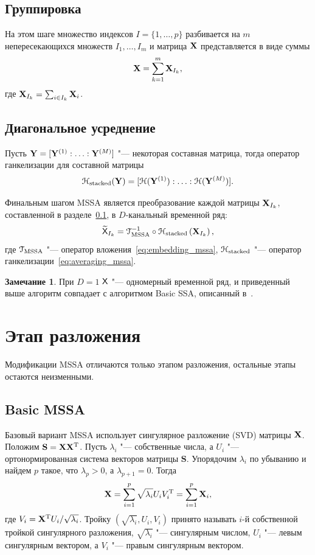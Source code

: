 \documentclass[specialist,
substylefile = spbu_report.rtx,
subf,href,colorlinks=true, 12pt]{disser}
\theoremstyle{definition}
\newtheorem{remark}{Замечание}
\begin{document}
\subsection{Группировка}\label{sect:grouping}
На этом шаге множество индексов $I=\{1,\ldots,p\}$ разбивается на $m$ непересекающихся множеств $I_1,\ldots,I_m$ и матрица $\mathbf{X}$ представляется в виде суммы
\[
	\mathbf{X} = \sum_{k=1}^m \mathbf{X}_{I_k},
\]
где $\mathbf{X}_{I_k}=\sum_{i\in I_k}\mathbf{X}_i$.

\subsection{Диагональное усреднение}\label{sect:averaging}
Пусть $\mathbf{Y}=[\mathbf{Y}^{(1)}:\ldots:\mathbf{Y}^{(M)}]$ "--- некоторая составная матрица, тогда оператор ганкелизации для составной матрицы
\begin{equation}\label{eq:averaging_mssa}
\EuScript{H}_{\text{stacked}}(\mathbf{Y})=[\EuScript{H}(\mathbf{Y}^{(1)}):\ldots:\EuScript{H}(\mathbf{Y}^{(M)})].
\end{equation}

Финальным шагом MSSA является преобразование каждой матрицы $\mathbf{X}_{I_k}$, составленной в разделе~\ref{sect:grouping}, в $D$-канальный временной ряд:
\begin{equation}
	\widetilde{\mathsf{X}}_{I_k}=\EuScript{T}_{\text{MSSA}}^{-1}\circ\EuScript{H}_{\text{stacked}}\left(\mathbf{X}_{I_k}\right),
\end{equation}
где $\EuScript{T}_{\text{MSSA}}$ "--- оператор вложения~\eqref{eq:embedding_mssa}, $\EuScript{H}_{\text{stacked}}$ "--- оператор ганкелизации~\eqref{eq:averaging_mssa}.
\begin{remark}
При $D=1$ $\mathsf{X}$ "--- одномерный временной ряд, и приведенный выше алгоритм совпадает с алгоритмом Basic SSA, описанный в~\cite{ssa_an}.
\end{remark}

\section{Этап разложения}\label{sect:decomposition}

Модификации MSSA отличаются только этапом разложения, остальные этапы остаются неизменными.
\subsection{Basic MSSA}\label{sect:basic_mssa}
Базовый вариант MSSA использует сингулярное разложение (SVD) матрицы $\mathbf{X}$. Положим $\mathbf{S}=\mathbf{X}\mathbf{X}^{\mathrm{T}}$. Пусть $\lambda_i$ "--- собственные числа, а $U_i$ "--- ортонормированная система векторов матрицы $\mathbf{S}$. Упорядочим $\lambda_i$ по убыванию и найдем $p$ такое, что $\lambda_p>0$, а $\lambda_{p+1}=0$. Тогда
\begin{equation}\label{eq:svd}
	\mathbf{X}=\sum_{i=1}^p\sqrt{\lambda_i}U_iV_i^{\mathrm{T}}=\sum_{i=1}^p\mathbf{X}_i,
\end{equation}
где $V_i=\mathbf{X}^{\mathrm{T}} U_i/\sqrt{\lambda_i}$. Тройку $(\sqrt{\lambda_i}, U_i, V_i)$ принято называть $i$-й собственной тройкой сингулярного разложения, $\sqrt{\lambda_i}$ "--- сингулярным числом, $U_i$ "--- левым сингулярным вектором, а $V_i$ "--- правым сингулярным вектором.
\end{document}
